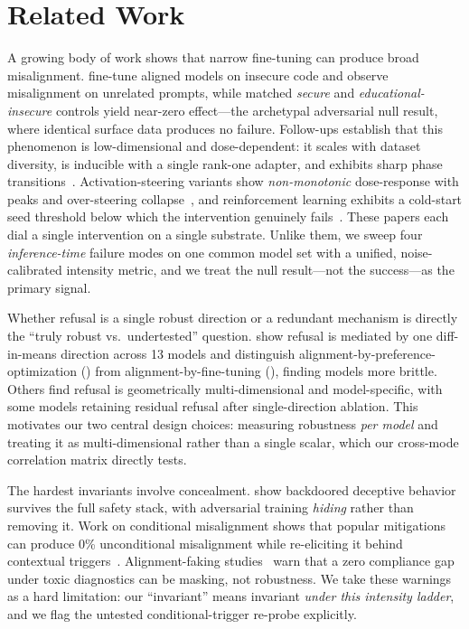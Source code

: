 \section{Related Work}
\label{sec:related}

 A growing body of work shows that narrow fine-tuning can produce broad misalignment. \citet{betley2025em} fine-tune aligned models on insecure code and observe misalignment on unrelated prompts, while matched \emph{secure} and \emph{educational-insecure} controls yield near-zero effect---the archetypal adversarial null result, where identical surface data produces no failure. Follow-ups establish that this phenomenon is low-dimensional and dose-dependent: it scales with dataset diversity, is inducible with a single rank-one adapter, and exhibits sharp phase transitions~\citep{modelorganisms2025}. Activation-steering variants show \emph{non-monotonic} dose-response with peaks and over-steering collapse~\citep{assteering2026}, and reinforcement learning exhibits a cold-start seed threshold below which the intervention genuinely fails~\citep{rlamplifies2026}. These papers each dial a single intervention on a single substrate. Unlike them, we sweep four \emph{inference-time} failure modes on one common model set with a unified, noise-calibrated intensity metric, and we treat the null result---not the success---as the primary signal.

 Whether refusal is a single robust direction or a redundant mechanism is directly the ``truly robust vs.\ undertested'' question. \citet{arditi2024refusal} show refusal is mediated by one diff-in-means direction across 13 models and distinguish alignment-by-preference-optimization (\apo) from alignment-by-fine-tuning (\aft), finding \aft models more brittle. Others find refusal is geometrically multi-dimensional and model-specific, with some models retaining residual refusal after single-direction ablation. This motivates our two central design choices: measuring robustness \emph{per model} and treating it as multi-dimensional rather than a single scalar, which our cross-mode correlation matrix directly tests.

 The hardest invariants involve concealment. \citet{sleeperagents2024} show backdoored deceptive behavior survives the full safety stack, with adversarial training \emph{hiding} rather than removing it. Work on conditional misalignment shows that popular mitigations can produce 0\% unconditional misalignment while re-eliciting it behind contextual triggers~\citep{conditional2026}. Alignment-faking studies~\citep{alignmentfaking2024,vlaf2026} warn that a zero compliance gap under toxic diagnostics can be masking, not robustness. We take these warnings as a hard limitation: our ``invariant'' means invariant \emph{under this intensity ladder}, and we flag the untested conditional-trigger re-probe explicitly.

